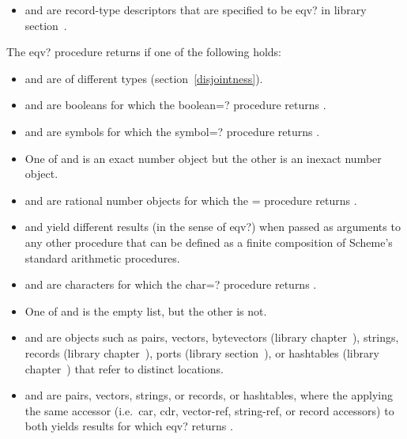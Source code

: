 \begin{entry}{%
}
\begin{itemize}
\item {} and  are record-type descriptors that are
  specified to be {\cf eqv?} in library
  section~.
\end{itemize}

The {\cf eqv?} procedure returns \schfalse{} if one of the following holds:

\begin{itemize}
\item {} and  are of different types
(section~\ref{disjointness}).

\item {} and  are booleans for which the {\cf
    boolean=?} procedure returns \schfalse.

\item {} and  are symbols for which the {\cf
    symbol=?} procedure returns \schfalse.

\item One of  and  is an exact number object but the other is
        an inexact number object.

\item {} and  are rational number objects for which the {\cf =} procedure
  returns \schfalse{}.

\item {} and  yield different results (in the sense of
  {\cf eqv?}) when passed as arguments to any other procedure
  that can be defined as a finite composition of Scheme's
  standard arithmetic procedures.

\item {} and  are characters for which the {\cf char=?}
  procedure returns \schfalse{}.

\item One of  and  is the empty list, but the other is not.

\item {} and  are objects such as pairs, vectors,
  bytevectors (library
  chapter~), strings,
  records (library
  chapter~), ports (library
  section~), or hashtables
  (library chapter~) that
  refer to distinct locations.

\item {} and  are pairs, vectors, strings, or
  records, or hashtables, where the applying the same accessor (i.e.\
  {\cf car}, {\cf cdr}, {\cf vector-ref}, {\cf string-ref}, or record
  accessors) to both yields results for which {\cf eqv?} returns
  \schfalse.


\end{itemize}
\end{entry}
